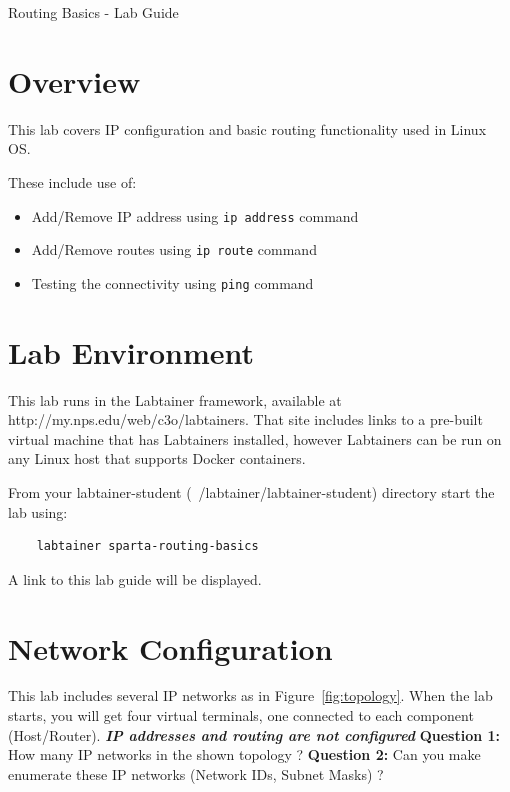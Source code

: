 


\begin{center}
{\LARGE Routing Basics - Lab Guide}
\vspace{0.1in}\\
\end{center}

\copyrightnotice

\section{Overview}
This lab covers IP configuration and basic routing functionality used in Linux OS.

These include use of:
\begin{itemize}
	\item Add/Remove IP address using \texttt{ip address} command
	\item Add/Remove routes using \texttt{ip route} command
	\item Testing the connectivity using \texttt{ping} command
\end{itemize}

\section{Lab Environment}
This lab runs in the Labtainer framework,
available at http://my.nps.edu/web/c3o/labtainers.
That site includes links to a pre-built virtual machine
that has Labtainers installed, however Labtainers can
be run on any Linux host that supports Docker containers.

From your labtainer-student (~/labtainer/labtainer-student) directory start the lab using:
\begin{verbatim}
    labtainer sparta-routing-basics
\end{verbatim}
\noindent A link to this lab guide will be displayed.

\section{Network Configuration}
This lab includes several IP networks as in Figure~\ref{fig:topology}.
When the lab starts, you will get four virtual terminals, one connected to each component (Host/Router).
\newline
\newline
\textbf{\textit{IP addresses and routing are not configured}}
\newline
\newline
\textbf{Question 1:}
How many IP networks in the shown topology ?
\newline
\newline
\textbf{Question 2:}
Can you make enumerate these IP networks (Network IDs, Subnet Masks) ?
\newline
\newline

